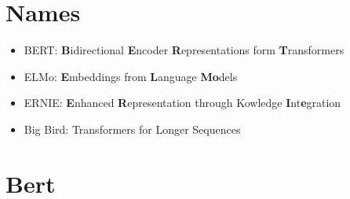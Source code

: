 \documentclass[11pt]{book}
\begin{document}
\section{Names}
\begin{itemize}
    \item BERT: \textbf{B}idirectional \textbf{E}ncoder \textbf{R}epresentations form \textbf{T}ransformers
    \item ELMo: \textbf{E}mbeddings from \textbf{L}anguage \textbf{Mo}dels
    \item ERNIE: \textbf{E}nhanced \textbf{R}epresentation through Kowledge \textbf{I}nt\textbf{e}gration
    \item Big Bird: Transformers for Longer Sequences
\end{itemize}

\section{Bert}
\end{document}
